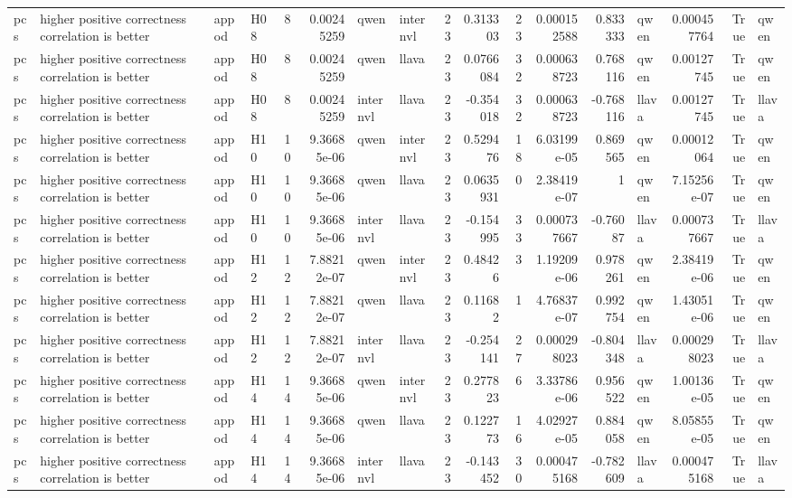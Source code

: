 \begin{longtable}{llllrrllrrrrrlrrl}
pcs & higher positive correctness correlation is better & appod & H08 & 8 & 0.00245259 & qwen & internvl & 23 & 0.313303 & 23 & 0.000152588 & 0.833333 & qwen & 0.000457764 & True & qwen \\
pcs & higher positive correctness correlation is better & appod & H08 & 8 & 0.00245259 & qwen & llava & 23 & 0.0766084 & 32 & 0.000638723 & 0.768116 & qwen & 0.00127745 & True & qwen \\
pcs & higher positive correctness correlation is better & appod & H08 & 8 & 0.00245259 & internvl & llava & 23 & -0.354018 & 32 & 0.000638723 & -0.768116 & llava & 0.00127745 & True & llava \\
pcs & higher positive correctness correlation is better & appod & H10 & 10 & 9.36685e-06 & qwen & internvl & 23 & 0.529476 & 18 & 6.03199e-05 & 0.869565 & qwen & 0.00012064 & True & qwen \\
pcs & higher positive correctness correlation is better & appod & H10 & 10 & 9.36685e-06 & qwen & llava & 23 & 0.0635931 & 0 & 2.38419e-07 & 1 & qwen & 7.15256e-07 & True & qwen \\
pcs & higher positive correctness correlation is better & appod & H10 & 10 & 9.36685e-06 & internvl & llava & 23 & -0.154995 & 33 & 0.000737667 & -0.76087 & llava & 0.000737667 & True & llava \\
pcs & higher positive correctness correlation is better & appod & H12 & 12 & 7.88212e-07 & qwen & internvl & 23 & 0.48426 & 3 & 1.19209e-06 & 0.978261 & qwen & 2.38419e-06 & True & qwen \\
pcs & higher positive correctness correlation is better & appod & H12 & 12 & 7.88212e-07 & qwen & llava & 23 & 0.11682 & 1 & 4.76837e-07 & 0.992754 & qwen & 1.43051e-06 & True & qwen \\
pcs & higher positive correctness correlation is better & appod & H12 & 12 & 7.88212e-07 & internvl & llava & 23 & -0.254141 & 27 & 0.000298023 & -0.804348 & llava & 0.000298023 & True & llava \\
pcs & higher positive correctness correlation is better & appod & H14 & 14 & 9.36685e-06 & qwen & internvl & 23 & 0.277823 & 6 & 3.33786e-06 & 0.956522 & qwen & 1.00136e-05 & True & qwen \\
pcs & higher positive correctness correlation is better & appod & H14 & 14 & 9.36685e-06 & qwen & llava & 23 & 0.122773 & 16 & 4.02927e-05 & 0.884058 & qwen & 8.05855e-05 & True & qwen \\
pcs & higher positive correctness correlation is better & appod & H14 & 14 & 9.36685e-06 & internvl & llava & 23 & -0.143452 & 30 & 0.000475168 & -0.782609 & llava & 0.000475168 & True & llava \\

\end{longtable}
